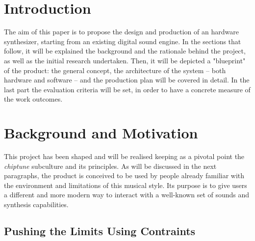 \documentclass[]{article}
\author{Silvio Gregorini}
\title{}
\date{2019}
\begin{document}

\section{Introduction} %

    The aim of this paper is to propose the design and production of an 
    hardware synthesizer, starting from an existing digital sound engine.
    In the sections that follow, it will be explained the background and the rationale 
    behind the project, as well as the initial research undertaken.
    Then, it will be depicted a "blueprint" of the product: the general concept, the 
    architecture of the system -- both hardware and software -- and the production plan 
    will be covered in detail.
    In the last part the evaluation criteria will be set, in order to have a concrete measure
    of the work outcomes.

\section{Background and Motivation}

    This project has been shaped and will be realised keeping as a pivotal point the
    \emph{chiptune} subculture and its principles. As will be discussed in the next paragraphs,
    the product is conceived to be used by people already familiar with the environment and 
    limitations of this musical style. Its purpose is to give users a different and more 
    modern way to interact with a well-known set of sounds and synthesis capabilities.

    \subsection{Pushing the Limits Using Contraints} %
\end{document}
